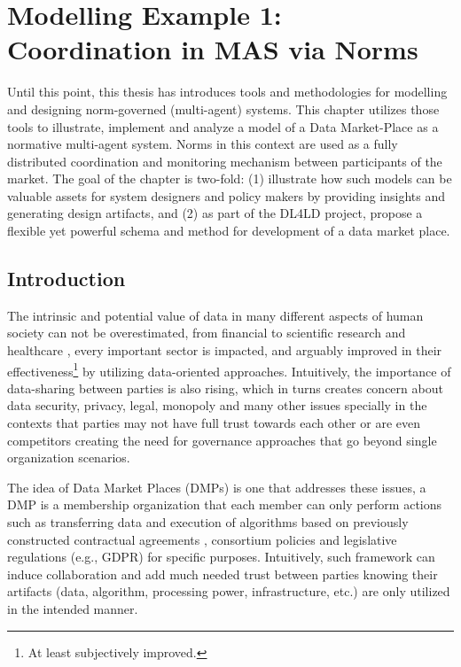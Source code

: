 \chapter{Modelling Example 1: Coordination in MAS via Norms}
\label{ch:cmf}

Until this point, this thesis has introduces tools and methodologies for modelling and designing norm-governed (multi-agent) systems. This chapter utilizes those tools to illustrate, implement and analyze a model of a Data Market-Place as a normative multi-agent system. Norms in this context are used as a fully distributed coordination and monitoring mechanism between participants of the market. The goal of the chapter is two-fold: (1) illustrate how such models can be valuable assets for system designers and policy makers by providing insights and generating design artifacts, and (2) as part of the DL4LD project, propose a flexible yet powerful schema and method for development of a data market place.

\section{Introduction}
The intrinsic and potential value of data in many different aspects of human society can not be overestimated, from financial \cite{Hasan2020} to scientific research \cite{Yuri2013} and healthcare \cite{Shilo2020}, every important sector is impacted, and arguably improved in their effectiveness\footnote{At least subjectively improved.} by utilizing data-oriented approaches. Intuitively, the importance of data-sharing between parties is also rising, which in turns creates concern about data security, privacy, legal, monopoly and many other issues specially in the contexts that parties may not have full trust towards each other or are even competitors \cite{clifton2004privacy} creating the need for governance approaches that go beyond single organization scenarios. 

The idea of Data Market Places (DMPs) is one that addresses these issues, a DMP is a membership organization that each member can only perform actions such as transferring data and execution of algorithms based on previously constructed contractual agreements \cite{Zhang2019ModelingPlaces,Shakeri2019}, consortium policies and legislative regulations (e.g., GDPR) for specific purposes. Intuitively, such framework can induce collaboration and add much needed trust between parties knowing their artifacts (data, algorithm, processing power, infrastructure, etc.) are only utilized in the intended manner.

